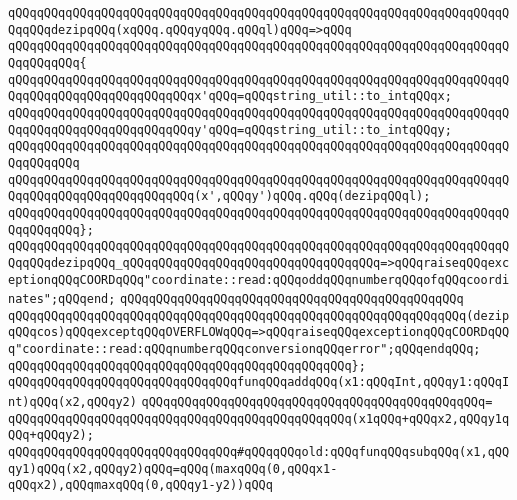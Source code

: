 \verb|qQQqqQQqqQQqqQQqqQQqqQQqqQQqqQQqqQQqqQQqqQQqqQQqqQQqqQQqqQQqqQQqqQQqqQQqqQQqdezipqQQq(xqQQq.qQQqyqQQq.qQQql)qQQq=>qQQq|\newline
\verb|qQQqqQQqqQQqqQQqqQQqqQQqqQQqqQQqqQQqqQQqqQQqqQQqqQQqqQQqqQQqqQQqqQQqqQQqqQQqqQQq{|\newline
\verb|qQQqqQQqqQQqqQQqqQQqqQQqqQQqqQQqqQQqqQQqqQQqqQQqqQQqqQQqqQQqqQQqqQQqqQQqqQQqqQQqqQQqqQQqqQQqqQQqx'qQQq=qQQqstring_util::to_intqQQqx;|\newline
\verb|qQQqqQQqqQQqqQQqqQQqqQQqqQQqqQQqqQQqqQQqqQQqqQQqqQQqqQQqqQQqqQQqqQQqqQQqqQQqqQQqqQQqqQQqqQQqqQQqy'qQQq=qQQqstring_util::to_intqQQqy;|\newline
\verb|qQQqqQQqqQQqqQQqqQQqqQQqqQQqqQQqqQQqqQQqqQQqqQQqqQQqqQQqqQQqqQQqqQQqqQQqqQQqqQQq|\newline
\verb|qQQqqQQqqQQqqQQqqQQqqQQqqQQqqQQqqQQqqQQqqQQqqQQqqQQqqQQqqQQqqQQqqQQqqQQqqQQqqQQqqQQqqQQqqQQqqQQq(x',qQQqy')qQQq.qQQq(dezipqQQql);|\newline
\verb|qQQqqQQqqQQqqQQqqQQqqQQqqQQqqQQqqQQqqQQqqQQqqQQqqQQqqQQqqQQqqQQqqQQqqQQqqQQqqQQq};|\newline
\verb|qQQqqQQqqQQqqQQqqQQqqQQqqQQqqQQqqQQqqQQqqQQqqQQqqQQqqQQqqQQqqQQqqQQqqQQqqQQqdezipqQQq_qQQqqQQqqQQqqQQqqQQqqQQqqQQqqQQqqQQq=>qQQqraiseqQQqexceptionqQQqCOORDqQQq"coordinate::read:qQQqoddqQQqnumberqQQqofqQQqcoordinates";qQQqend;|\newline
\verb|qQQqqQQqqQQqqQQqqQQqqQQqqQQqqQQqqQQqqQQqqQQqqQQq|\newline
\verb|qQQqqQQqqQQqqQQqqQQqqQQqqQQqqQQqqQQqqQQqqQQqqQQqqQQqqQQqqQQqqQQq(dezipqQQqcos)qQQqexceptqQQqOVERFLOWqQQq=>qQQqraiseqQQqexceptionqQQqCOORDqQQq"coordinate::read:qQQqnumberqQQqconversionqQQqerror";qQQqendqQQq;|\newline
\verb|qQQqqQQqqQQqqQQqqQQqqQQqqQQqqQQqqQQqqQQqqQQqqQQq};|\newline
\newline
\verb|qQQqqQQqqQQqqQQqqQQqqQQqqQQqqQQqfunqQQqaddqQQq(x1:qQQqInt,qQQqy1:qQQqInt)qQQq(x2,qQQqy2)|\newline
\verb|qQQqqQQqqQQqqQQqqQQqqQQqqQQqqQQqqQQqqQQqqQQqqQQq=|\newline
\verb|qQQqqQQqqQQqqQQqqQQqqQQqqQQqqQQqqQQqqQQqqQQqqQQq(x1qQQq+qQQqx2,qQQqy1qQQq+qQQqy2);|\newline
\newline
\verb|qQQqqQQqqQQqqQQqqQQqqQQqqQQqqQQq#qQQqqQQqold:qQQqfunqQQqsubqQQq(x1,qQQqy1)qQQq(x2,qQQqy2)qQQq=qQQq(maxqQQq(0,qQQqx1-qQQqx2),qQQqmaxqQQq(0,qQQqy1-y2))qQQq|\newline
\newline
